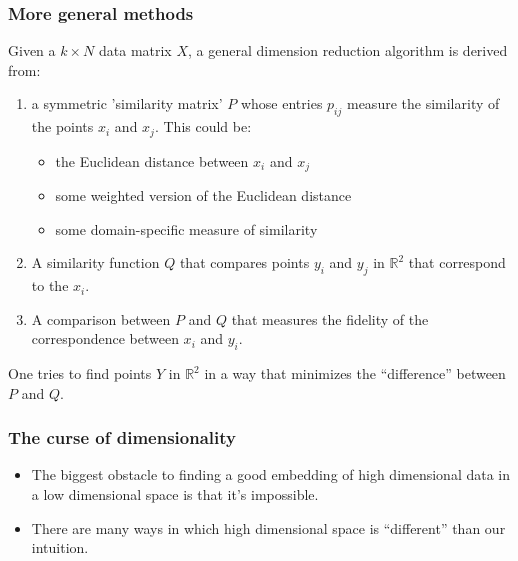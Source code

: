 \documentclass{beamer}
\begin{document}
\begin{frame}
  \frametitle{More general methods}

  Given a $k\times N$ data matrix $X$, a general dimension reduction algorithm is derived from:
  
  \begin{enumerate}
  \item   a symmetric 'similarity matrix' $P$ whose   entries $p_{ij}$ measure the similarity of the points $x_i$ and $x_j$.  This could be:

    \begin{itemize}
    \item the Euclidean distance between   $x_i$ and $x_j$
    \item some weighted version of the Euclidean distance
    \item some domain-specific measure of similarity
    \end{itemize}

  \item A similarity function $Q$ that compares points $y_i$ and $y_j$ in $\mathbb{R}^{2}$ that correspond to the $x_i$. 
  \item A comparison between $P$ and $Q$ that measures the fidelity of the correspondence between $x_i$ and $y_i$.
  \end{enumerate}
  One tries to find points $Y$ in $\mathbb{R}^{2}$ in a way that minimizes the ``difference'' between $P$ and $Q$.
\end{frame}
\begin{frame}
  \frametitle{The curse of dimensionality}
\begin{itemize}
\item  The biggest obstacle to finding a good embedding of high dimensional data in a low dimensional space is that it's impossible.

\item  There are many ways in which high dimensional space is ``different'' than our intuition.
\end{itemize}

\end{frame}
\end{document}
